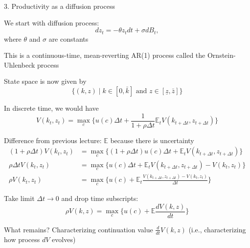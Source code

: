\documentclass[11pt, aspectratio=169]{beamer}
\newenvironment{witemize}{\itemize\addtolength{\itemsep}{10pt}}{\enditemize}
\begin{document}
\begin{frame}{3. Productivity as a diffusion process}
\begin{witemize}
\item We start with diffusion process:
\begin{equation*}
	dz_t = - \theta z_t dt + \sigma dB_t,
\end{equation*}
where $\theta$ and $\sigma$ are constants

\item This is a continuous-time, mean-reverting AR(1) process called the Ornstein-Uhlenbeck process

\item State space is now given by
\begin{equation*}
	\Big\{ (k, z) \mid k \in [0, \bar k] \text{ and } z \in [\underline z, \bar z] \Big\}
\end{equation*}
\end{witemize}
\end{frame}


\begin{frame}{}

{\small
\begin{witemize}
\item In discrete time, we would have 
\begin{equation*}
	V(k_t, z_t) = \max_c \Big\{ u(c) \Delta t + \frac{1}{1 + \rho \Delta t} \mathbb{E}_t V(k_{t + \Delta t}, z_{t + \Delta t} ) \Big\}
\end{equation*}

\item Difference from previous lecture: $\mathbb E$ because there is uncertainty
\begin{align*}
	(1 + \rho \Delta t) V(k_t, z_t) &= \max_c \Big\{ (1 + \rho \Delta t) u(c) \Delta t+ \mathbb{E}_t V(k_{t + \Delta t}, z_{t + \Delta t})  \Big\} \\
	\rho \Delta t V(k_t, z_t) &= \max_c \Big\{ u(c) \Delta t+ \mathbb{E}_t V(k_{t + \Delta t}, z_{t + \Delta t} ) - V(k_t, z_t) \Big\} \\
	\rho V(k_t, z_t) &= \max_c \Big\{ u(c) + \mathbb{E}_t \frac{V(k_{t + \Delta t}, z_{t + \Delta t} ) - V(k_t, z_t)}{\Delta t} \Big\}
\end{align*}

\item Take limit $\Delta t \to 0$ and drop time subscripts: 
\begin{equation*}
	\rho V(k, z) = \max_c \Big\{ u(c) + \mathbb{E} \frac{d V(k, z)}{dt} \Big\}
\end{equation*}

\item What remains? Characterizing continuation value $\frac{d}{dt} V(k, z)$ (i.e., characterizing how process $dV$ evolves)

\end{witemize}
}
\end{frame}
\end{document}
